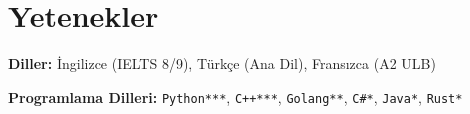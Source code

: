 \section{Yetenekler}

\begin{onecolentry}
    \textbf{Diller:} İngilizce (IELTS 8/9), Türkçe (Ana Dil), Fransızca (A2 ULB) 
\end{onecolentry}

\vspace{\betweenentryspace}

\begin{onecolentry}
    \textbf{Programlama Dilleri:} \verb|Python***|, \verb|C++***|, \verb|Golang**|, \verb|C#*|, \verb|Java*|, \verb|Rust*|
\end{onecolentry}

\vspace{\betweenentryspace}

